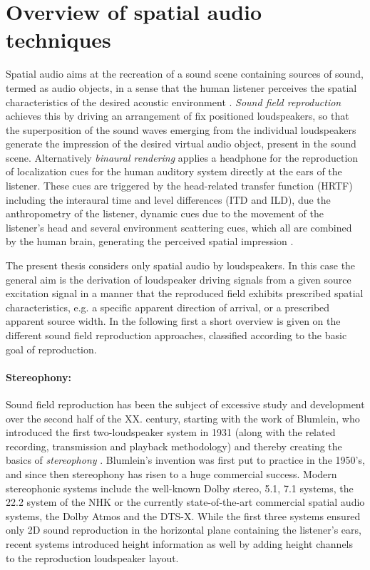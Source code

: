 \section{Overview of spatial audio techniques}
Spatial audio aims at the recreation of a sound scene containing sources of sound, termed as audio objects, in a sense that the human listener perceives the spatial characteristics of the desired acoustic environment \cite{Zhang2017}.
\emph{Sound field reproduction} achieves this by driving an arrangement of fix positioned loudspeakers, so that the superposition of the sound waves emerging from the individual loudspeakers generate the impression of the desired virtual audio object, present in the sound scene.
Alternatively \emph{binaural rendering} applies a headphone for the reproduction of localization cues for the human auditory system directly at the ears of the listener.
These cues are triggered by the head-related transfer function (HRTF) including the interaural time and level differences (ITD and ILD), due the anthropometry of the listener, dynamic cues due to the movement of the listener's head and several environment scattering cues, which all are combined by the human brain, generating the perceived spatial impression \cite{Blauert1983}.

The present thesis considers only spatial audio by loudspeakers.
In this case the general aim is the derivation of loudspeaker driving signals from a given source excitation signal in a manner that the reproduced field exhibits prescribed spatial characteristics, e.g. a specific apparent direction of arrival, or a prescribed apparent source width.
In the following first a short overview is given on the different sound field reproduction approaches, classified according to the basic goal of reproduction.

\paragraph{Stereophony:}
Sound field reproduction has been the subject of excessive study and development over the second half of the XX. century, starting with the work of Blumlein, who introduced the first two-loudspeaker system in 1931 (along with the related recording, transmission and playback methodology) and thereby creating the basics of \emph{stereophony} \cite{Blumlein1932, Alexander2000}.
Blumlein's invention was first put to practice in the 1950's, and since then stereophony has risen to a huge commercial success.
Modern stereophonic systems include the well-known Dolby stereo, 5.1, 7.1 systems, the 22.2 system of the NHK \cite{hamasaki2005the, hamasaki2011the} or the currently state-of-the-art commercial spatial audio systems, the Dolby Atmos \cite{Atmos} and the DTS-X.
While the first three systems ensured only 2D sound reproduction in the horizontal plane containing the listener's ears, recent systems introduced height information as well by adding height channels to the reproduction loudspeaker layout.

